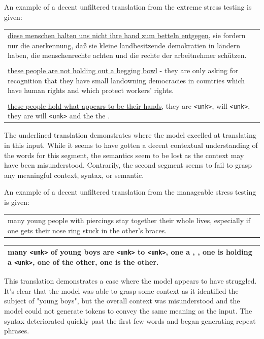 \documentclass[11pt,a4paper]{article}
\begin{document}
An example of a decent unfiltered translation from the extreme stress testing is given:
\begin{center}
\begin{tabular}{p{2.5in}}
    \hline
    \ul{diese menschen halten uns nicht ihre hand zum betteln entgegen}, sie fordern nur die anerkennung, daß sie kleine landbesitzende demokratien in ländern haben, die menschenrechte achten und die rechte der arbeitnehmer schützen.\\
    \\
    \ul{these people are not holding out a begging bowl} - they are only asking for recognition that they have small landowning democracies in countries which have human rights and which protect workers' rights.\\
    \\
    \ul{these people hold what appears to be their hands}, they are \verb|<unk>|, will \verb|<unk>|, they are will \verb|<unk>| and the the .\\
    \hline
\end{tabular}
\end{center}
The underlined translation demonstrates where the model excelled at translating in this input. While it seems to have gotten a decent contextual understanding of the words for this segment, the semantics seem to be lost as the context may have been misunderstood. Contrarily, the second segment seems to fail to grasp any meaningful context, syntax, or semantic. 

An example of a decent unfiltered translation from the manageable stress testing is given:
\begin{center}
\begin{tabular}{p{2.5in}}
    \hline
    many young people with piercings stay together their whole lives, especially if one gets their nose ring stuck in the other's braces.\\
\end{tabular}
\end{center}
\begin{center}
\begin{tabular}{p{2.5in}}
    many \verb|<unk>| of young boys are \verb|<unk>| to \verb|<unk>|, one a , , one is holding a \verb|<unk>|, one of the other, one is the other.\\
    \hline
\end{tabular}
\end{center}
This translation demonstrates a case where the model appears to have struggled. It's clear that the model was able to grasp some context as it identified the subject of "young boys", but the overall context was misunderstood and the model could not generate tokens  to convey the same meaning as the input. The syntax deteriorated quickly past the first few words and began generating repeat phrases.
\end{document}
